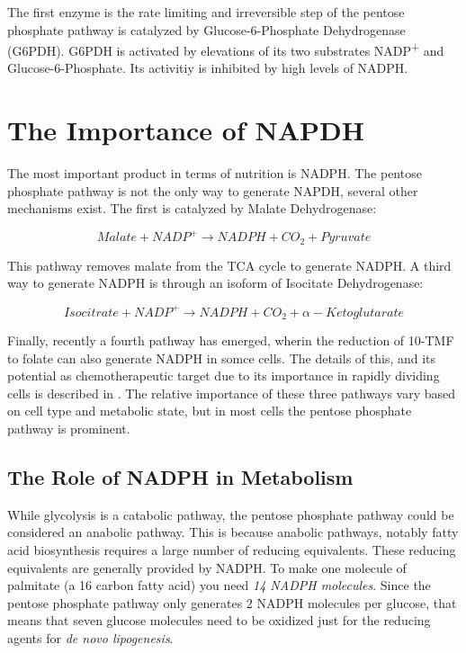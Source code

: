 \documentclass{tufte-handout}
\begin{document}
The first enzyme is the rate limiting and irreversible step of the pentose phosphate pathway is catalyzed by Glucose-6-Phosphate Dehydrogenase (G6PDH).  G6PDH is activated by elevations of its two substrates NADP\textsuperscript{+} and Glucose-6-Phosphate.  Its activitiy is inhibited by high levels of NADPH.

\section{The Importance of NAPDH}

The most important product in terms of nutrition is NADPH. The pentose phosphate pathway is not the only way to generate NAPDH, several other mechanisms exist.  The first is catalyzed by Malate Dehydrogenase:

\begin{equation}
Malate + NADP^+ \rightarrow NADPH + CO_2+ Pyruvate
\end{equation}

This pathway removes malate from the TCA cycle to generate NADPH.  A third way to generate NADPH is through an isoform of Isocitate Dehydrogenase:

\begin{equation}
Isocitrate + NADP^+ \rightarrow NADPH + CO_2 + \alpha-Ketoglutarate
\end{equation}

Finally, recently a fourth pathway has emerged, wherin the reduction of 10-TMF to folate can also generate NADPH in somce cells.  The details of this, and its potential as chemotherapeutic target due to its importance in rapidly dividing cells  is described in \citet{Fan2014a}.  The relative importance of these three pathways vary based on cell type and metabolic state, but in most cells the pentose phosphate pathway is prominent.

\subsection{The Role of NADPH in Metabolism}
While glycolysis is a catabolic pathway, the pentose phosphate pathway could be considered an anabolic pathway.  This is because anabolic pathways, notably fatty acid biosynthesis requires a large number of reducing equivalents.  These reducing equivalents are generally provided by NADPH.  To make one molecule of palmitate (a 16 carbon fatty acid) you need \emph{14 NADPH molecules}.  Since the pentose phosphate pathway only generates 2 NADPH molecules per glucose, that means that seven glucose molecules need to be oxidized just for the reducing agents for \textit{de novo lipogenesis}.
\end{document}
